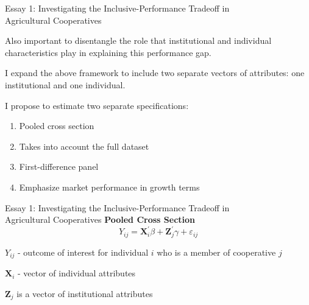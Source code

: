 \documentclass[aspectratio=169]{beamer}
\newenvironment{wideitemize}{\itemize\addtolength{\itemsep}{10pt}}{\enditemize}
\begin{document}
\begin{frame}{Essay 1: Investigating the Inclusive-Performance Tradeoff in \\ \hspace{1.7cm} Agricultural Cooperatives}
    \begin{wideitemize}
        \item Also important to disentangle the role that institutional and individual characteristics play in explaining this performance gap. 
        \item I expand the above framework to include two separate vectors of attributes: one institutional and one individual. 
        \item I propose to estimate two separate specifications: \vspace{.25cm}
            \begin{enumerate}
                \item Pooled cross section
                    \begin{wideitemize}
                        \item Takes into account the full dataset \vspace{.25cm}
                    \end{wideitemize}
                \item First-difference panel
                    \begin{wideitemize}
                        \item Emphasize market performance in growth terms
                    \end{wideitemize}
            \end{enumerate}
    \end{wideitemize}    
\end{frame}

\begin{frame}{Essay 1: Investigating the Inclusive-Performance Tradeoff in \\ \hspace{1.7cm} Agricultural Cooperatives}
\textbf{Pooled Cross Section} \vspace{1cm}
        \begin{equation} \label{eq:E1_4}
            Y_{ij} = \mathbf{X}_i^{\prime}\beta + \mathbf{Z}_j^{\prime}\gamma + \varepsilon_{ij}
        \end{equation}  
    \begin{wideitemize}    
        \item $Y_{ij}$ - outcome of interest for individual $i$ who is a member of cooperative $j$
        \item $\mathbf{X}_i$ - vector of individual attributes
        \item $\mathbf{Z}_j$ is a vector of institutional attributes
    \end{wideitemize}    
\end{frame}
\end{document}
